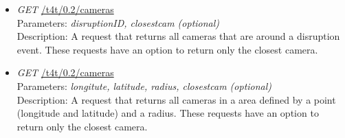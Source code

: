\begin{itemize}
\item \emph{GET} \url{/t4t/0.2/cameras} \\
Parameters: \emph{disruptionID, closestcam (optional)} \\
Description: A request that returns all cameras that are around a disruption event. These requests have an option to return only the closest camera.
\item \emph{GET} \url{/t4t/0.2/cameras} \\
Parameters: \emph{longitute, latitude, radius, closestcam (optional)} \\
Description: A request that returns all cameras in a area defined by a point (longitude and latitude) and a radius. These requests have an option to return only the closest camera.

\end{itemize}
